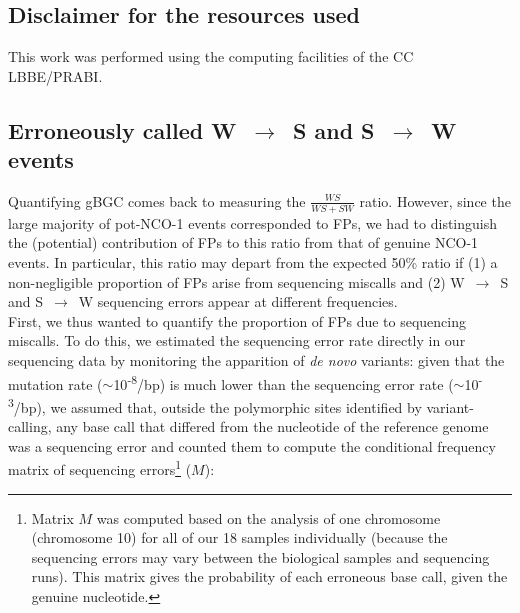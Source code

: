 \subsection{Disclaimer for the resources used}

This work was performed using the computing facilities of the CC LBBE/PRABI\@.


\subsection{Erroneously called W~$\rightarrow$~S and S~$\rightarrow$~W events}

Quantifying gBGC comes back to measuring the $\frac{WS}{WS+SW}$ ratio.
However, since the large majority of pot-NCO-1 events corresponded to FPs, we had to distinguish the (potential) contribution of FPs to this ratio from that of genuine NCO-1 events.
In particular, this ratio may depart from the expected 50\% ratio if (1) a non-negligible proportion of FPs arise from sequencing miscalls and (2) W~$\rightarrow$~S and S~$\rightarrow$~W sequencing errors appear at different frequencies.\\

First, we thus wanted to quantify the proportion of FPs due to sequencing miscalls.
To do this, we estimated the sequencing error rate directly in our sequencing data by monitoring the apparition of \textit{de novo} variants:
given that the mutation rate ($\sim$10\textsuperscript{-8}/bp) is much lower than the sequencing error rate ($\sim$10\textsuperscript{-3}/bp), we assumed that, outside the polymorphic sites identified by variant-calling, any base call that differed from the nucleotide of the reference genome was a sequencing error and counted them to compute the conditional frequency matrix of sequencing errors\footnote{Matrix $M$ was computed based on the analysis of one chromosome (chromosome 10) for all of our 18 samples individually (because the sequencing errors may vary between the biological samples and sequencing runs). This matrix gives the probability of each erroneous base call, given the genuine nucleotide.} ($M$):

